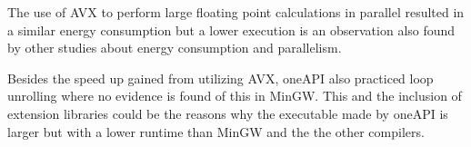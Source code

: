 The use of AVX to perform large floating point calculations in parallel resulted in a similar energy consumption but a lower execution is an observation also found by other studies about energy consumption and parallelism\cite{Lindholt2022}.

Besides the speed up gained from utilizing AVX, oneAPI also practiced loop unrolling where no evidence is found of this in MinGW. This and the inclusion of extension libraries could be the reasons why the executable made by oneAPI is larger but with a lower runtime than MinGW and the the other compilers.









